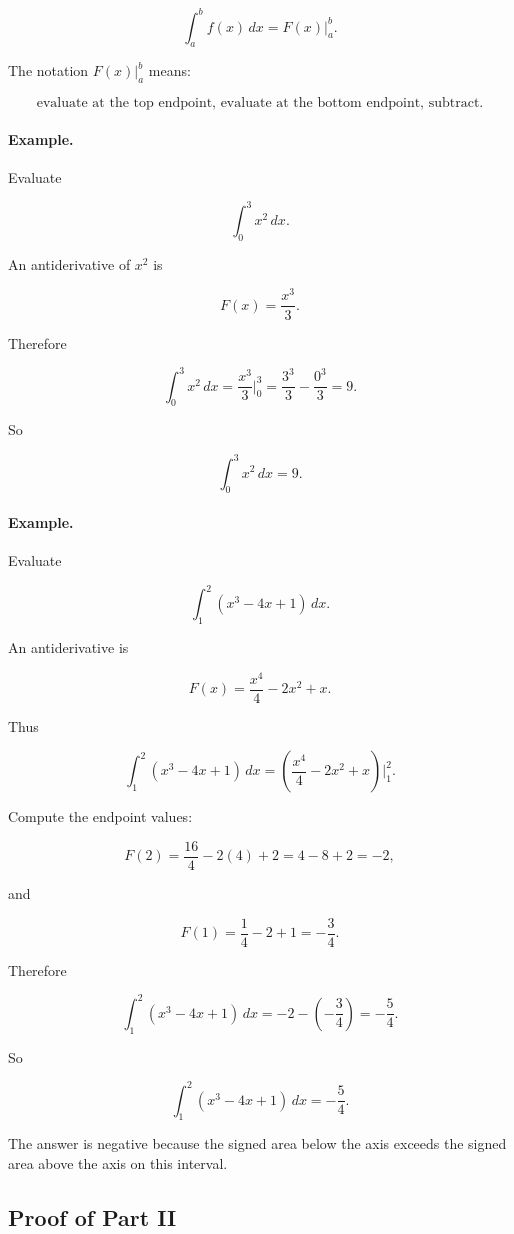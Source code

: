 \[
\boxed{
\int_a^b f(x)\,dx=F(x)\Big|_a^b.
}
\]

The notation \(F(x)\big|_a^b\) means:

\[
\text{evaluate at the top endpoint, evaluate at the bottom endpoint, subtract.}
\]

\paragraph{Example.}
Evaluate

\[
\int_0^3 x^2\,dx.
\]

An antiderivative of \(x^2\) is

\[
F(x)=\frac{x^3}{3}.
\]

Therefore

\[
\int_0^3 x^2\,dx
=
\frac{x^3}{3}\Big|_0^3
=
\frac{3^3}{3}-\frac{0^3}{3}
=
9.
\]

So

\[
\boxed{
\int_0^3 x^2\,dx=9.
}
\]

\paragraph{Example.}
Evaluate

\[
\int_1^2 (x^3-4x+1)\,dx.
\]

An antiderivative is

\[
F(x)=\frac{x^4}{4}-2x^2+x.
\]

Thus

\[
\int_1^2 (x^3-4x+1)\,dx
=
\left(\frac{x^4}{4}-2x^2+x\right)\Big|_1^2.
\]

Compute the endpoint values:

\[
F(2)=\frac{16}{4}-2(4)+2=4-8+2=-2,
\]

and

\[
F(1)=\frac14-2+1=-\frac34.
\]

Therefore

\[
\int_1^2 (x^3-4x+1)\,dx
=
-2-\left(-\frac34\right)
=
-\frac54.
\]

So

\[
\boxed{
\int_1^2 (x^3-4x+1)\,dx=-\frac54.
}
\]

The answer is negative because the signed area below the axis exceeds the signed area
above the axis on this interval.

\subsection{Proof of Part II}
\label{subsec:proof-ftc2}

